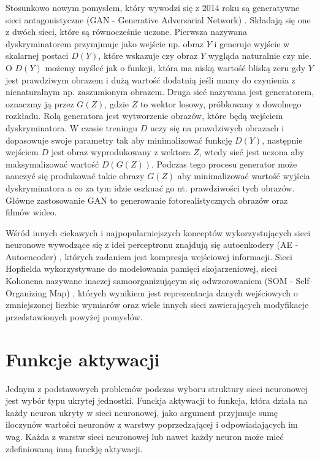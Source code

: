 \documentclass[11pt]{book}
\theoremstyle{definition}
\begin{document}
Stosunkowo nowym pomysłem, który wywodzi się z 2014 roku są generatywne sieci antagonistyczne (GAN - Generative Adversarial Network) \cite{2014arXiv1406.2661G}. Składają się one z dwóch sieci, które są równocześnie uczone. Pierwsza nazywana dyskryminatorem przymjmuje jako wejście np. obraz $Y$ i generuje wyjście w skalarnej postaci $D(Y)$, które wskazuje czy obraz $Y$ wygląda naturalnie czy nie. O $D(Y)$ możemy myśleć jak o funkcji, która ma niską wartość bliską zeru gdy $Y$ jest prawdziwym obrazem i dużą wartość dodatnią jeśli mamy do czynienia z nienaturalnym np. zaszumionym obrazem. Druga sieć nazywana jest generatorem, oznaczmy ją przez $G(Z)$, gdzie $Z$ to wektor losowy, próbkowany z dowolnego rozkładu. Rolą generatora jest wytworzenie obrazów, które będą wejściem dyskryminatora. W czasie treningu $D$ uczy się na prawdziwych obrazach i dopasowuje swoje parametry tak aby minimalizować funkcję $D(Y)$, następnie wejściem $D$ jest obraz wyprodukowany z wektora $Z$, wtedy sieć jest uczona aby maksymalizować wartość $D(G(Z))$. Podczas tego procesu generator może nauczyć się produkować takie obrazy $G(Z)$ aby minimalizować wartość wyjścia dyskryminatora a co za tym idzie oszkuać go nt. prawdziwości tych obrazów. Główne zastosowanie GAN to generowanie fotorealistycznych obrazów oraz filmów wideo.

Wśród innych ciekawych i najpopularniejszych konceptów wykorzystujących sieci neuronowe wywodzące się z idei perceptronu znajdują się autoenkodery (AE - Autoencoder) \cite{1988Autoencoders}, których zadaniem jest kompresja wejściowej informacji. Sieci Hopfielda \cite{hopfield-neural-networks-and-1982} wykorzystywane do modelowania pamięci skojarzeniowej, sieci Kohonena nazywane inaczej samoorganizującym się odwzorowaniem (SOM - Self-Organizing Map) \cite{Kohonen1982}, których wynikiem jest reprezentacja danych wejściowych o zmniejszonej liczbie wymiarów oraz wiele innych sieci zawierających modyfikacje przedstawionych powyżej pomysłów.


\section{Funkcje aktywacji}
\label{activation}
Jednym z podstawowych problemów podczas wyboru struktury sieci neuronowej jest wybór typu ukrytej jednostki. Funckja aktywacji to funkcja, która działa na każdy neuron ukryty w sieci neuronowej, jako argument przyjmuje sumę iloczynów wartości neuronów z warstwy poprzedzającej i odpowiadających im wag. Każda z warstw sieci  neuronowej lub nawet każdy neuron może mieć zdefiniowaną inną funckję aktywacji.
\end{document}
